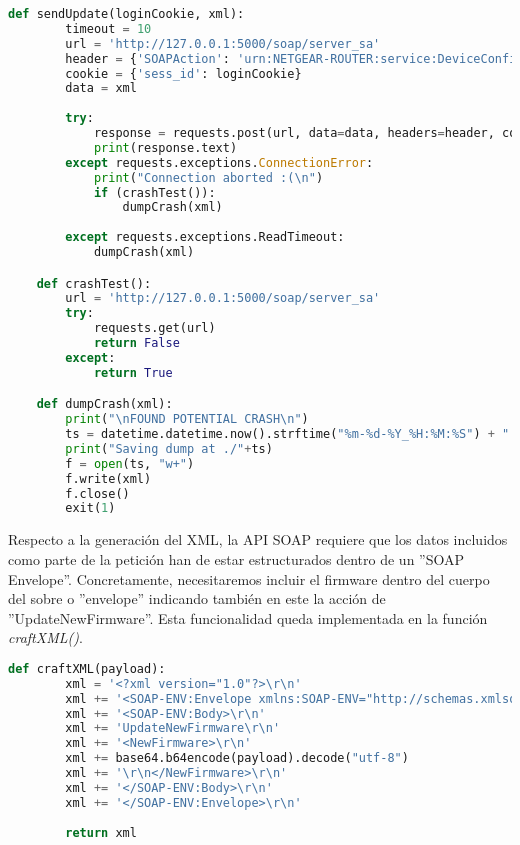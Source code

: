 \begin{lstlisting}[language=python, caption=Envío de actualización de firmware al servicio UPNP., captionpos=b,
    frame=single, breaklines, showstringspaces=false]
    def sendUpdate(loginCookie, xml):
        timeout = 10
        url = 'http://127.0.0.1:5000/soap/server_sa'
        header = {'SOAPAction': 'urn:NETGEAR-ROUTER:service:DeviceConfig:1#UpdateNewFirmware'}
        cookie = {'sess_id': loginCookie}
        data = xml
        
        try:
            response = requests.post(url, data=data, headers=header, cookies=cookie, timeout=timeout)
            print(response.text)
        except requests.exceptions.ConnectionError:
            print("Connection aborted :(\n")
            if (crashTest()):
                dumpCrash(xml)
                
        except requests.exceptions.ReadTimeout:
            dumpCrash(xml)

    def crashTest():
        url = 'http://127.0.0.1:5000/soap/server_sa'
        try:
            requests.get(url)
            return False
        except:
            return True

    def dumpCrash(xml):
        print("\nFOUND POTENTIAL CRASH\n")
        ts = datetime.datetime.now().strftime("%m-%d-%Y_%H:%M:%S") + ".dmp"
        print("Saving dump at ./"+ts)
        f = open(ts, "w+")
        f.write(xml)
        f.close()
        exit(1)
\end{lstlisting}

Respecto a la generación del XML, la API SOAP requiere que los datos incluidos como parte de la petición han de estar estructurados 
dentro de un ''SOAP Envelope''. Concretamente, necesitaremos incluir el firmware dentro del cuerpo del sobre o ''envelope'' indicando también en este 
la acción de ''UpdateNewFirmware''. Esta funcionalidad queda implementada en la función \textit{craftXML()}.

\begin{lstlisting}[language=python, caption=Generación del sobre XML con el firmware para la actualización desde UPNP., captionpos=b,
    frame=single, breaklines, showstringspaces=false]
    def craftXML(payload):
        xml = '<?xml version="1.0"?>\r\n'
        xml += '<SOAP-ENV:Envelope xmlns:SOAP-ENV="http://schemas.xmlsoap.org/soap/envelope/" SOAP-ENV:encodingStyle="http://schemas.xmlsoap.$\r\n'
        xml += '<SOAP-ENV:Body>\r\n'
        xml += 'UpdateNewFirmware\r\n'
        xml += '<NewFirmware>\r\n'
        xml += base64.b64encode(payload).decode("utf-8")
        xml += '\r\n</NewFirmware>\r\n'
        xml += '</SOAP-ENV:Body>\r\n'
        xml += '</SOAP-ENV:Envelope>\r\n'
        
        return xml
\end{lstlisting}

